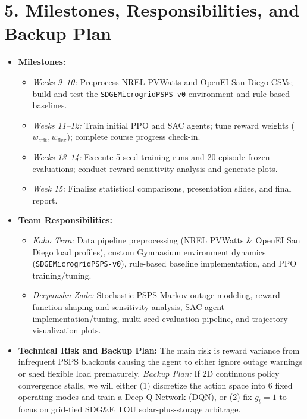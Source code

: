 \documentclass[11pt,letterpaper]{article}
\begin{document}
\section*{5. Milestones, Responsibilities, and Backup Plan}
\begin{itemize}
  \item \textbf{Milestones:}
  \begin{itemize}
    \item \emph{Weeks 9--10:} Preprocess NREL PVWatts and OpenEI San Diego CSVs; build and test the \texttt{SDGEMicrogridPSPS-v0} environment and rule-based baselines.
    \item \emph{Weeks 11--12:} Train initial PPO and SAC agents; tune reward weights ($w_{\text{crit}}, w_{\text{flex}}$); complete course progress check-in.
    \item \emph{Weeks 13--14:} Execute 5-seed training runs and 20-episode frozen evaluations; conduct reward sensitivity analysis and generate plots.
    \item \emph{Week 15:} Finalize statistical comparisons, presentation slides, and final report.
  \end{itemize}
  \item \textbf{Team Responsibilities:}
  \begin{itemize}
    \item \emph{Kaho Tran:} Data pipeline preprocessing (NREL PVWatts \& OpenEI San Diego load profiles), custom Gymnasium environment dynamics (\texttt{SDGEMicrogridPSPS-v0}), rule-based baseline implementation, and PPO training/tuning.
    \item \emph{Deepanshu Zade:} Stochastic PSPS Markov outage modeling, reward function shaping and sensitivity analysis, SAC agent implementation/tuning, multi-seed evaluation pipeline, and trajectory visualization plots.
  \end{itemize}
  \item \textbf{Technical Risk and Backup Plan:} The main risk is reward variance from infrequent PSPS blackouts causing the agent to either ignore outage warnings or shed flexible load prematurely. \emph{Backup Plan:} If 2D continuous policy convergence stalls, we will either (1) discretize the action space into 6 fixed operating modes and train a Deep Q-Network (DQN), or (2) fix $g_t = 1$ to focus on grid-tied SDG\&E TOU solar-plus-storage arbitrage.
\end{itemize}
\end{document}
